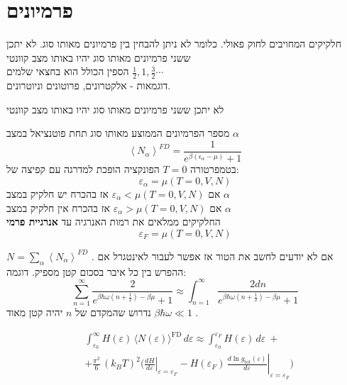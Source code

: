 \section{פרמיונים}
חלקיקים המחויבים לחוק פאולי. כלומר לא ניתן להבחין בין פרמיונים מאותו סוג. 
לא יתכן ששני פרמיונים מאותו סוג יהיו באותו מצב קוונטי\\הספין הכולל הוא בחצאי שלמים $\tfrac{1}{2},1,\tfrac{3}{2}\cdots$\\
דוגמאות - אלקטרונים, פרוטונים וניוטרונים.

\begin{cheatformula}
לא יתכן ששני פרמיונים מאותו סוג יהיו באותו מצב קוונטי
\end{cheatformula}

\begin{cheatformula}
מספר הפרמיונים הממוצע מאותו סוג תחת פוטנציאל במצב $\alpha$ 
    $$\left<N_\alpha \right>^{FD} = \frac{1}{e^{\beta \left(\epsilon_\alpha -\mu \right) }+1}$$
בטמפרטורה $T=0$ הפונקציה הופכת למדרגה עם קפיצה של:
$$\varepsilon_\alpha = \mu \left(T=0, V, N\right)$$
אם $\varepsilon_\alpha < \mu \left(T=0, V,N\right)$ אז בהכרח יש חלקיק במצב $\alpha$
\\
אם $\varepsilon_\alpha > \mu \left(T=0, V,N\right)$ אז בהכרח אין חלקיק במצב $\alpha$
\\
החלקיקים ממלאים את רמות האנרגיה עד \textbf{אנרגיית פרמי}
$$\varepsilon_F = \mu \left(T=0, V,N\right)$$
\end{cheatformula}

\begin{cheatformula}
$N = \sum_\alpha \left< N_\alpha \right>^{FD}$ .
אם לא יודעים לחשב את הטור אז אפשר לעבור לאינטגרל אם ההפרש בין כל איבר בסכום קטן מספיק. דוגמה:
$$\sum_{n=1}^\infty \frac{2}{e^{\beta \hbar \omega \left(n+\frac{1}{2} \right) - \beta \mu}+1} \approx \int_{n=1}^\infty \frac{2 dn}{e^{\beta \hbar \omega \left(n+\frac{1}{2} \right) - \beta \mu}+1}$$
נדרוש שהמקדם של $n$ יהיה קטן מאוד
$\beta \hbar \omega \ll 1$ .
\end{cheatformula}

\begin{cheatformula}
\begin{align*}
&\int_{\varepsilon_0}^{\infty} H(\varepsilon)\,\bigl\langle N(\varepsilon)\bigr\rangle^{\mathrm{FD}}\,d\varepsilon
\approx \int_{\varepsilon_0}^{\varepsilon_F} H(\varepsilon)\,d\varepsilon \ + \\[6pt]
&+ \frac{\pi^2}{6}\,(k_B T)^2
\Biggl(
\left.\frac{dH}{d\varepsilon}\right|_{\varepsilon=\varepsilon_F}
- H(\varepsilon_F)\,
\left.\frac{d\ln g_{\mathrm{tot}}(\varepsilon)}{d\varepsilon}\right|_{\varepsilon=\varepsilon_F}
\Biggr)
\end{align*}

\end{cheatformula}
